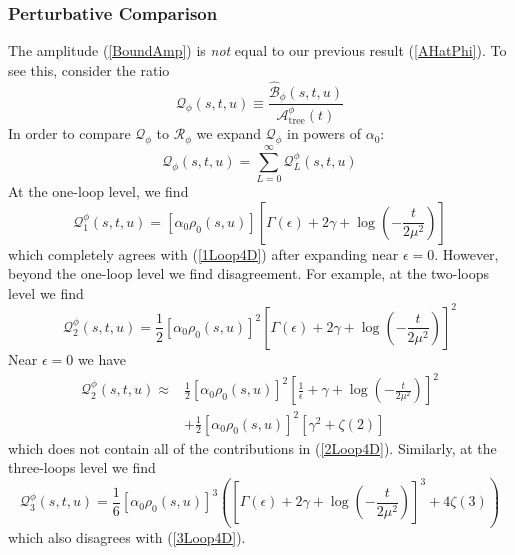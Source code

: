 \subsubsection{Perturbative Comparison}
The amplitude (\ref{BoundAmp}) is \textit{not} equal to our previous result (\ref{AHatPhi}). To see this, consider the ratio
\begin{equation}
	\mathcal{Q}_{\phi}(s, t, u) \equiv \frac{\widehat{\mathcal{B}}_{\phi}(s, t, u)}{\mathcal{A}_{\text{tree}}^{\phi}(t)}
\end{equation}
In order to compare $\mathcal{Q}_{\phi}$ to $\mathcal{R}_{\phi}$ we expand $\mathcal{Q}_{\phi}$ in powers of $\alpha_{0}$:
\begin{equation}
	\mathcal{Q}_{\phi}(s, t, u) = \sum_{L = 0}^{\infty} \mathcal{Q}_{L}^{\phi}(s, t, u)
\end{equation}
At the one-loop level, we find
\begin{equation}
	\mathcal{Q}_{1}^{\phi}(s, t, u) = [\alpha_{0} \rho_{0}(s,u)] \left[ \Gamma(\epsilon) + 2 \gamma + \log{\left( -\frac{t}{2 \mu^{2}} \right)} \right]
\end{equation}
which completely agrees with (\ref{1Loop4D}) after expanding near $\epsilon = 0$. However, beyond the one-loop level we find disagreement. For example, at the two-loops level we find
\begin{equation}
	\mathcal{Q}_{2}^{\phi}(s, t, u) = \frac{1}{2} [\alpha_{0} \rho_{0}(s,u)]^{2} \left[ \Gamma(\epsilon) + 2 \gamma + \log{\left( -\frac{t}{2 \mu^{2}} \right)} \right]^{2}
\end{equation}
Near $\epsilon = 0$ we have
\begin{equation}
\begin{split}
	\mathcal{Q}_{2}^{\phi}(s, t, u) \approx &{} \frac{1}{2} [\alpha_{0} \rho_{0}(s,u)]^{2} \left[ \frac{1}{\epsilon} + \gamma + \log{\left( -\frac{t}{2 \mu^{2}} \right)} \right]^{2} \\
	&+ \frac{1}{2} [\alpha_{0} \rho_{0}(s,u)]^{2} \left[ \gamma^{2} + \zeta(2) \right]
\end{split}
\end{equation}
which does not contain all of the contributions in (\ref{2Loop4D}). Similarly, at the three-loops level we find
\begin{equation}
	\mathcal{Q}_{3}^{\phi}(s, t, u) = \frac{1}{6} [\alpha_{0} \rho_{0}(s,u)]^{3} \left( \left[ \Gamma(\epsilon) + 2 \gamma + \log{\left( -\frac{t}{2 \mu^{2}} \right)} \right]^{3} + 4 \zeta(3) \right)
\end{equation}
which also disagrees with (\ref{3Loop4D}).

